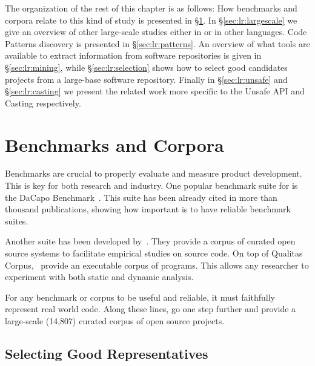 The organization of the rest of this chapter is as follows: 
How benchmarks and corpora relate to this kind of study is presented in \S\ref{sec:lr:benchmarks}.
In \S\ref{sec:lr:largescale} we give an overview of other large-scale studies either in \java{} or in other languages.
Code Patterns discovery is presented in \S\ref{sec:lr:patterns}.
An overview of what tools are available to extract information from software repositories is given in \S\ref{sec:lr:mining},
while \S\ref{sec:lr:selection} shows how to select good candidates projects from a large-base software repository.
Finally in \S\ref{sec:lr:unsafe} and \S\ref{sec:lr:casting} we present the related work more specific to the Unsafe API and Casting respectively.


\section{Benchmarks and Corpora}
\label{sec:lr:benchmarks}

Benchmarks are crucial to properly evaluate and measure product development.
This is key for both research and industry.
One popular benchmark suite for \java{} is the DaCapo Benchmark~\citep{blackburnDaCapoBenchmarksJava2006}.
This suite has been already cited in more than thousand publications, showing how important is to have reliable benchmark suites.

Another suite has been developed by~\cite{temperoQualitasCorpusCurated2010}.
They provide a corpus of curated open source systems to facilitate empirical studies on source code.
On top of Qualitas Corpus,~\cite{dietrichXCorpusExecutableCorpus2017} provide an executable corpus of \java{} programs.
This allows any researcher to experiment with both static and dynamic analysis.

For any benchmark or corpus to be useful and reliable, it must faithfully represent real world code.
Along these lines, \cite{allamanisMiningSourceCode2013} go one step further and provide a large-scale (14,807) curated corpus of open source \java{} projects.

\subsection*{Selecting Good Representatives}
\label{sec:lr:selection}

